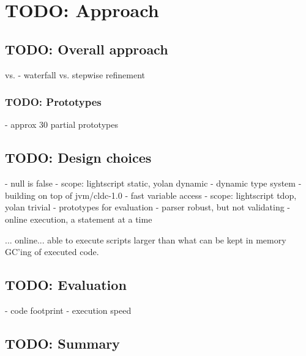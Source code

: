 \chapter{TODO: Approach}
\section{TODO: Overall approach}
\cite{waterfall} vs. \cite{stepwise-refinement}
    - waterfall vs. stepwise refinement
\subsection{TODO: Prototypes}
    - approx 30 partial prototypes
\section{TODO: Design choices}
    - null is false
    - scope: lightscript static, yolan dynamic
    - dynamic type system
    - building on top of jvm/cldc-1.0
    - fast variable access
    - scope: lightscript tdop, yolan trivial
    - prototypes for evaluation
    - parser robust, but not validating
    - online execution, a statement at a time

... online... able to execute scripts larger than what can be kept in memory
GC'ing of executed code.
\section{TODO: Evaluation}
    - code footprint
    - execution speed
\section{TODO: Summary}
